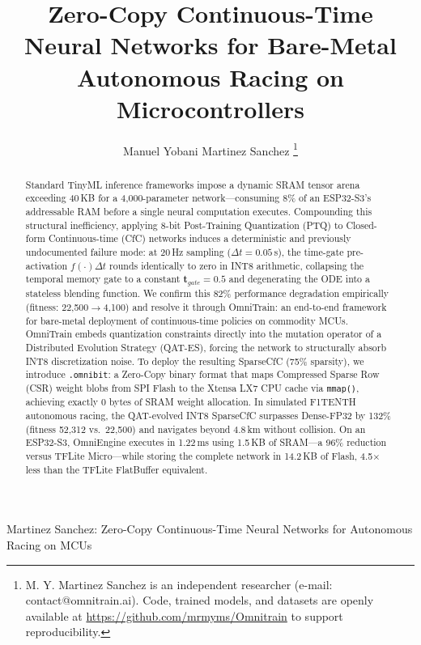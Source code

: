 \documentclass[lettersize,journal]{IEEEtran}
\begin{document}
\title{Zero-Copy Continuous-Time Neural Networks for Bare-Metal Autonomous Racing on Microcontrollers}

\author{Manuel Yobani Martinez Sanchez
\thanks{M. Y. Martinez Sanchez is an independent researcher (e-mail: contact@omnitrain.ai). Code, trained models, and datasets are openly available at \url{https://github.com/mrmyms/Omnitrain} to support reproducibility.}}

%
{Martinez Sanchez: Zero-Copy Continuous-Time Neural Networks for Autonomous Racing on MCUs}

\maketitle

\begin{abstract}
Standard TinyML inference frameworks impose a dynamic SRAM tensor arena exceeding 40\,KB for a 4,000-parameter network---consuming 8\% of an ESP32-S3's addressable RAM before a single neural computation executes. Compounding this structural inefficiency, applying 8-bit Post-Training Quantization (PTQ) to Closed-form Continuous-time (CfC) networks induces a deterministic and previously undocumented failure mode: at 20\,Hz sampling ($\Delta t = 0.05$\,s), the time-gate pre-activation $f(\cdot)\Delta t$ rounds identically to zero in INT8 arithmetic, collapsing the temporal memory gate to a constant $\mathbf{t}_{gate} = 0.5$ and degenerating the ODE into a stateless blending function. We confirm this 82\% performance degradation empirically (fitness: 22,500$\to$4,100) and resolve it through OmniTrain: an end-to-end framework for bare-metal deployment of continuous-time policies on commodity MCUs. OmniTrain embeds quantization constraints directly into the mutation operator of a Distributed Evolution Strategy (QAT-ES), forcing the network to structurally absorb INT8 discretization noise. To deploy the resulting SparseCfC (75\% sparsity), we introduce \texttt{.omnibit}: a Zero-Copy binary format that maps Compressed Sparse Row (CSR) weight blobs from SPI Flash to the Xtensa LX7 CPU cache via \texttt{mmap()}, achieving exactly 0 bytes of SRAM weight allocation. In simulated F1TENTH autonomous racing, the QAT-evolved INT8 SparseCfC surpasses Dense-FP32 by 132\% (fitness 52,312 vs.\ 22,500) and navigates beyond 4.8\,km without collision. On an ESP32-S3, OmniEngine executes in 1.22\,ms using 1.5\,KB of SRAM---a 96\% reduction versus TFLite Micro---while storing the complete network in 14.2\,KB of Flash, 4.5$\times$ less than the TFLite FlatBuffer equivalent.
\end{abstract}
\end{document}
